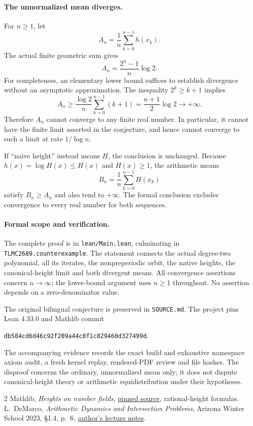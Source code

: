 \documentclass[11pt,a4paper]{article}
\begin{document}
\paragraph{The unnormalized mean diverges.}
For $n\ge1$, let
\[
A_n=\frac1n\sum_{k=0}^{n-1}h(x_k).
\]
The actual finite geometric sum gives
\[
A_n=\frac{2^n-1}{n}\log2.
\]
For completeness, an elementary lower bound suffices to establish
divergence without an asymptotic approximation. The inequality
$2^k\ge k+1$ implies
\[
A_n\ge\frac{\log2}{n}\sum_{k=0}^{n-1}(k+1)
=\frac{n+1}{2}\log2\longrightarrow+\infty.
\]
Therefore $A_n$ cannot converge to any finite real number. In particular,
it cannot have the finite limit asserted in the conjecture, and hence
cannot converge to such a limit at rate $1/\log n$.

If ``naive height'' instead means $H$, the conclusion is unchanged.
Because $h(x)=\log H(x)\le H(x)$ and $H(x)\ge1$, the arithmetic means
\[
B_n=\frac1n\sum_{k=0}^{n-1}H(x_k)
\]
satisfy $B_n\ge A_n$ and also tend to $+\infty$. The formal conclusion
excludes convergence to every real number for both sequences.

\paragraph{Formal scope and verification.}
The complete proof is in \texttt{lean/Main.lean}, culminating in
\texttt{TLMC2689.counterexample}. The statement connects the actual
degree-two polynomial, all its iterates, the nonpreperiodic orbit, the
native heights, the canonical-height limit and both divergent means.
All convergence assertions concern $n\to\infty$; the lower-bound argument
uses $n\ge1$ throughout. No assertion depends on a zero-denominator value.

The original bilingual conjecture is preserved in \texttt{SOURCE.md}.
The project pins Lean 4.33.0 and Mathlib commit
\begin{center}\small
\texttt{db584cd6d46c92f209a44c0f1c829460d327499d}.
\end{center}
The accompanying evidence records the exact build and exhaustive
namespace axiom audit, a fresh kernel replay, rendered-PDF review and
file hashes. The disproof concerns the ordinary, unnormalized mean only;
it does not dispute canonical-height theory or arithmetic
equidistribution under their hypotheses.

\begin{thebibliography}{2}
Mathlib, \emph{Heights on number fields},
\href{https://github.com/leanprover-community/mathlib4/blob/db584cd6d46c92f209a44c0f1c829460d327499d/Mathlib/NumberTheory/Height/NumberField.lean}{pinned source}, rational-height formulas.
L.~DeMarco, \emph{Arithmetic Dynamics and Intersection Problems},
Arizona Winter School 2023, \S1.4, p.~6,
\href{https://people.math.harvard.edu/~demarco/Math274/AWS_LectureNotes.pdf}{author's lecture notes}.
\end{thebibliography}
\end{document}
